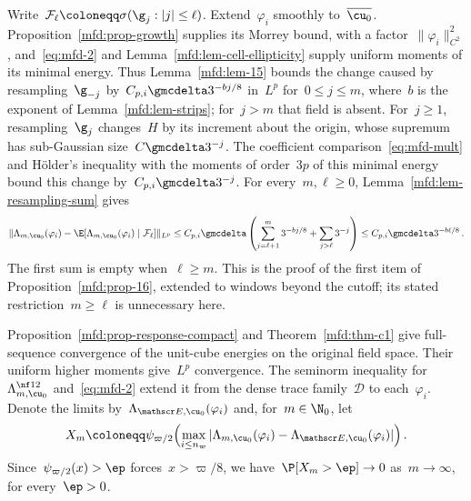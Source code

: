 \documentclass[11pt]{amsart}
\begin{document}
\smallskip

Write~$\mathcal F_\ell\coloneqq\sigma(\g_j:|j|\leq\ell)$. Extend~$\varphi_i$ smoothly to~$\overline{\cu_0}$. Proposition~\ref{mfd:prop-growth} supplies its Morrey bound, with a factor~$\|\varphi_i\|_{C^2}^2$, and~\eqref{eq:mfd-2} and Lemma~\ref{mfd:lem-cell-ellipticity} supply uniform moments of its minimal energy. Thus Lemma~\ref{mfd:lem-15} bounds the change caused by resampling~$\g_{-j}$ by~$C_{p,i}\gmcdelta3^{-bj/8}$ in~$L^p$ for~$0\leq j\leq m$, where~$b$ is the exponent of Lemma~\ref{mfd:lem-strips}; for~$j>m$ that field is absent. For~$j\geq1$, resampling~$\g_j$ changes~$H$ by its increment about the origin, whose supremum has sub-Gaussian size~$C\gmcdelta3^{-j}$. The coefficient comparison~\eqref{eq:mfd-mult} and H\"older's inequality with the moments of order~$3p$ of this minimal energy bound this change by~$C_{p,i}\gmcdelta3^{-j}$. For every~$m,\ell\geq0$, Lemma~\ref{mfd:lem-resampling-sum} gives
\begin{equation*}
	\|\Lambda_{m,\cu_0}(\varphi_i)-\E[\Lambda_{m,\cu_0}(\varphi_i)\mid\mathcal F_\ell]\|_{L^p}
	\leq C_{p,i}\gmcdelta\left(\sum_{j=\ell+1}^{m}3^{-bj/8}+\sum_{j>\ell}3^{-j}\right)
	\leq C_{p,i}\gmcdelta3^{-b\ell/8}\,.
\end{equation*}
The first sum is empty when~$\ell\geq m$. This is the proof of the first item of Proposition~\ref{mfd:prop-16}, extended to windows beyond the cutoff; its stated restriction~$m\geq\ell$ is unnecessary here.

\smallskip

Proposition~\ref{mfd:prop-response-compact} and Theorem~\ref{mfd:thm-c1} give full-sequence convergence of the unit-cube energies on the original field space. Their uniform higher moments give~$L^p$ convergence. The seminorm inequality for~$\Lambda_{m,\cu_0}^{\nf12}$ and~\eqref{eq:mfd-2} extend it from the dense trace family~$\mathcal D$ to each~$\varphi_i$. Denote the limits by~$\Lambda_{\mathscr E,\cu_0}(\varphi_i)$ and, for~$m\in\N_0$, let
\begin{equation*}
	X_m\coloneqq\psi_{\varpi/2}\Bigl(\max_{i\leq n_\varpi}|\Lambda_{m,\cu_0}(\varphi_i)-\Lambda_{\mathscr E,\cu_0}(\varphi_i)|\Bigr)\,.
\end{equation*}
Since~$\psi_{\varpi/2}(x)>\ep$ forces~$x>\varpi/8$, we have~$\P[X_m>\ep]\to0$ as~$m\to\infty$, for every~$\ep>0$.

\smallskip
\end{document}

